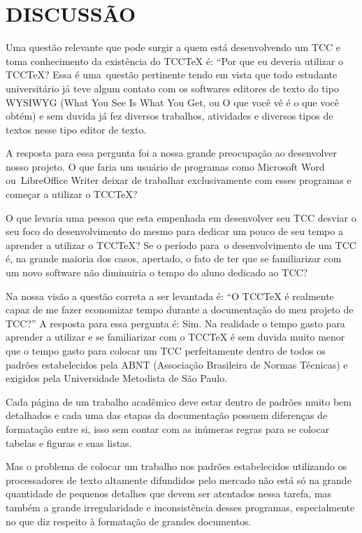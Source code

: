 \section{DISCUSS\~AO}

\bigskip

{
Uma quest\~ao relevante que pode surgir a quem est\'a desenvolvendo um TCC e toma conhecimento da exist\^encia do TCCTeX
\'e: ``Por que eu deveria utilizar o TCCTeX?{\textquotedbl} Essa \'e uma\ quest\~ao pertinente tendo em vista que todo
estudante universit\'ario j\'a teve algum contato com os softwares editores de texto do tipo WYSIWYG (What You See Is
What You Get, ou O que voc\^e v\^e \'e o que voc\^e obt\'em) e sem duvida j\'a fez diversos trabalhos, atividades e
diversos tipos de textos nesse tipo editor de texto.}

{
A resposta para essa pergunta foi a nossa grande preocupa\c{c}\~ao ao desenvolver nosso projeto. O que faria um
usu\'ario de programas como Microsoft Word ou\ LibreOffice Writer deixar de trabalhar exclusivamente com esses
programas e come\c{c}ar a utilizar o TCCTeX?}

{
O que levaria uma pessoa que esta empenhada em desenvolver seu TCC desviar o seu foco do desenvolvimento do mesmo para
dedicar um pouco de seu tempo a aprender a utilizar o TCCTeX? Se o per\'iodo para\ o desenvolvimento de um TCC \'e, na
grande maioria dos casos, apertado, o fato de ter que se familiarizar com um novo software n\~ao diminuiria o tempo do
aluno dedicado ao TCC?\ }

{
Na nossa vis\~ao a quest\~ao correta a ser levantada \'e: ``O TCCTeX \'e realmente capaz de me fazer economizar tempo
durante a documenta\c{c}\~ao do meu projeto de TCC?'' A resposta para essa pergunta \'e: Sim. Na realidade o tempo
gasto para aprender a utilizar e se familiarizar com o TCCTeX \'e sem duvida muito menor que o tempo gasto para colocar
um TCC perfeitamente dentro de todos os padr\~oes estabelecidos pela ABNT (Associa\c{c}\~ao Brasileira de Normas
T\'ecnicas) e exigidos pela Universidade Metodista de S\~ao Paulo.}

{
Cada p\'agina de um trabalho acad\^emico deve estar dentro de padr\~oes muito bem detalhados e cada uma das etapas da
documenta\c{c}\~ao possuem diferen\c{c}as de formata\c{c}\~ao entre si, isso sem contar com as in\'umeras regras para
se colocar tabelas e figuras e suas listas.}

{
Mas o problema de colocar um trabalho nos padr\~oes estabelecidos utilizando os processadores de texto altamente
difundidos pelo mercado n\~ao est\'a s\'o na grande quantidade de pequenos detalhes que devem ser atentados nessa
tarefa, mas tamb\'em a grande irregularidade e inconsist\^encia desses programas, especialmente no que diz respeito \`a
formata\c{c}\~ao de grandes documentos.}

